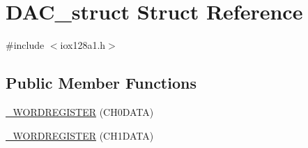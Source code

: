 \hypertarget{struct_d_a_c__struct}{
\section{DAC\_\-struct Struct Reference}
\label{struct_d_a_c__struct}
}


{\ttfamily \#include $<$iox128a1.h$>$}

\subsection*{Public Member Functions}
\begin{DoxyCompactItemize}
\item 
\hyperlink{struct_d_a_c__struct_ade7f5cbb61d511c014846c5f8d035093}{\_\-WORDREGISTER} (CH0DATA)
\item 
\hyperlink{struct_d_a_c__struct_a1b46955ff6abaa3b9564ee5c3680ec1c}{\_\-WORDREGISTER} (CH1DATA)
\end{DoxyCompactItemize}
